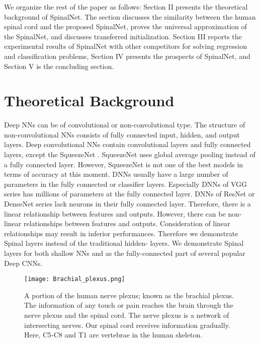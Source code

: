 \documentclass[journal]{IEEEtran}
\begin{document}
We organize the rest of the paper as follows: Section II presents the theoretical background of SpinalNet. The section discusses the similarity between the human spinal cord and the proposed SpinalNet, proves the universal approximation of the SpinalNet, and discusses transferred initialization. Section III reports the experimental results of SpinalNet with other competitors for solving regression and classification problems, Section IV presents the prospects of SpinalNet, and Section V is the concluding section.

\section{Theoretical Background}
Deep NNs can be of convolutional or non-convolutional type. The structure of non-convolutional NNs consists of fully connected input, hidden, and output layers. Deep convolutional NNs contain convolutional layers and fully connected layers, except the SqueezeNet \cite{iandola2016squeezenet}. SqueezeNet uses global average pooling instead of a fully connected layer. However, SqueezeNet is not one of the best models in terms of accuracy at this moment. DNNs usually have a large number of parameters in the fully connected or classifier layers. Especially DNNs of VGG series has millions of parameters at the fully connected layer. DNNs of ResNet or DenseNet series lack neurons in their fully connected layer. Therefore, there is a linear relationship between features and outputs. However, there can be non-linear relationships between features and outputs. Consideration of linear relationships may result in inferior performances. Therefore we demonstrate Spinal layers instead of the traditional hidden- layers. We demonstrate Spinal layers for both shallow NNs and as the fully-connected part of several popular Deep CNNs. 

\begin{figure}
  \centering
  \texttt{[image: Brachial\_plexus.png]}
  \caption{A portion of the human nerve plexus; known as the brachial plexus. The information of any touch or pain reaches the brain through the nerve plexus and the spinal cord. The nerve plexus is a network of intersecting nerves. Our spinal cord receives information gradually. Here, C5-C8 and T1 are vertebrae \cite{chang2019vascularized} in the human skeleton.}
  \label{Hsensory}
\end{figure}
\end{document}
